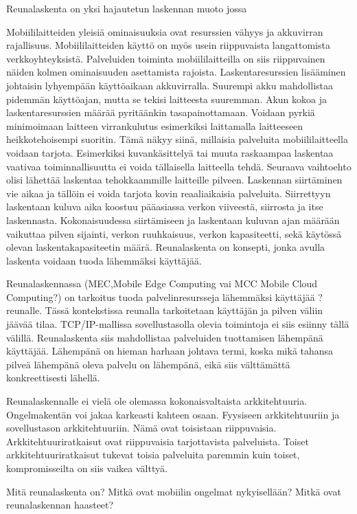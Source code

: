 \documentclass[finnish]{tktltiki2}
\theoremstyle{definition}
\theoremstyle{remark}
\begin{document}
Reunalaskenta on yksi hajautetun laskennan muoto jossa 

Mobiililaitteiden yleisiä ominaisuuksia ovat resurssien vähyys ja akkuvirran rajallisuus. Mobiililaitteiden käyttö on myös usein riippuvaista langattomista verkkoyhteyksistä.
Palveluiden toiminta mobiililaitteilla on siis riippuvainen näiden kolmen ominaisuuden asettamista rajoista.
Laskentaresurssien lisääminen johtaisin lyhyempään käyttöaikaan akkuvirralla. Suurempi akku mahdollistaa pidemmän käyttöajan, mutta se tekisi laitteesta suuremman. Akun kokoa ja laskentaresurssien määrää pyritäänkin tasapainottamaan.
Voidaan pyrkiä minimoimaan laitteen virrankulutus esimerkiksi laittamalla laitteeseen heikkotehoisempi suoritin. Tämä näkyy siinä, millaisia palveluita mobiililaitteella voidaan tarjota.
Esimerkiksi kuvankäsittelyä tai muuta raskaampaa laskentaa vaativaa toiminnallisuutta ei voida tällaisella laitteella tehdä. 
Seuraava vaihtoehto olisi lähettää laskentaa tehokkaammille laitteille pilveen. Laskennan siirtäminen vie aikaa ja tällöin ei voida tarjota kovin reaaliaikaisia palveluita.
Siirrettyyn laskentaan kuluva aika koostuu pääasiassa verkon viiveestä, siirrosta ja itse laskennasta. 
Kokonaisuudessa siirtämiseen ja laskentaan kuluvan ajan määrään vaikuttaa pilven sijainti, verkon ruuhkaisuus, verkon kapasiteetti, sekä käytössä olevan laskentakapasiteetin määrä.
Reunalaskenta on konsepti, jonka avulla laskenta voidaan tuoda lähemmäksi käyttäjää.

Reunalaskennassa (MEC,Mobile Edge Computing vai MCC Mobile Cloud Computing?) on tarkoitus tuoda palvelinresursseja lähemmäksi käyttäjää ? reunalle.
Tässä kontekstissa reunalla tarkoitetaan käyttäjän ja pilven väliin jäävää tilaa. TCP/IP-mallissa sovellustasolla olevia toimintoja ei siis esiinny tällä välillä.
Reunalaskenta siis mahdollistaa palveluiden tuottamisen lähempänä käyttäjää. Lähempänä on hieman harhaan johtava termi, koska mikä tahansa pilveä lähempänä oleva palvelu on lähempänä, eikä siis välttämättä konkreettisesti lähellä. 

Reunalaskennalle ei vielä ole olemassa kokonaisvaltaista arkkitehtuuria.
Ongelmakentän voi jakaa karkeasti kahteen osaan. Fyysiseen arkkitehtuuriin ja sovellustason arkkitehtuuriin. Nämä ovat toisistaan riippuvaisia.
Arkkitehtuuriratkaisut ovat riippuvaisia tarjottavista palveluista. Toiset arkkitehtuuriratkaisut tukevat toisia palveluita paremmin kuin toiset, kompromisseilta on siis vaikea välttyä.


Mitä reunalaskenta on?
Mitkä ovat mobiilin ongelmat nykyisellään?
Mitkä ovat reunalaskennan haasteet?
\end{document}
